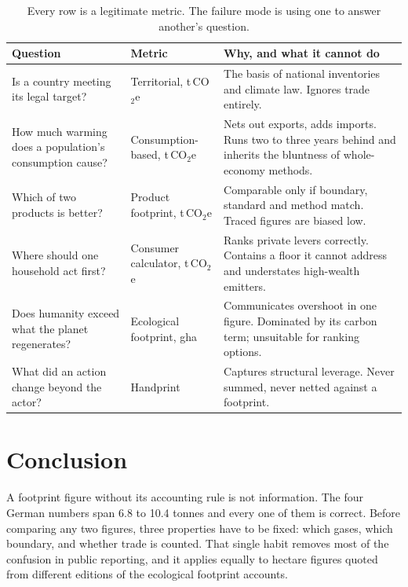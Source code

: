 \documentclass[11pt,a4paper]{article}
\begin{document}
\begin{table}[htbp]
\centering
\small
\caption{Every row is a legitimate metric. The failure mode is using one to answer
another's question.}
\vspace{2pt}
\begin{tabularx}{\linewidth}{@{}p{3.4cm}p{2.3cm}X@{}}
\toprule
\textbf{Question} & \textbf{Metric} & \textbf{Why, and what it cannot do} \\
\midrule
Is a country meeting its legal target? & Territorial, t\,CO$_2$e & The basis of national inventories and climate law. Ignores trade entirely. \\
\addlinespace[2pt]
How much warming does a population's consumption cause? & Consumption-based, t\,CO$_2$e & Nets out exports, adds imports. Runs two to three years behind and inherits the bluntness of whole-economy methods. \\
\addlinespace[2pt]
Which of two products is better? & Product footprint, t\,CO$_2$e & Comparable only if boundary, standard and method match. Traced figures are biased low. \\
\addlinespace[2pt]
Where should one household act first? & Consumer calculator, t\,CO$_2$e & Ranks private levers correctly. Contains a floor it cannot address and understates high-wealth emitters. \\
\addlinespace[2pt]
Does humanity exceed what the planet regenerates? & Ecological footprint, gha & Communicates overshoot in one figure. Dominated by its carbon term; unsuitable for ranking options. \\
\addlinespace[2pt]
What did an action change beyond the actor? & Handprint & Captures structural leverage. Never summed, never netted against a footprint. \\
\bottomrule
\end{tabularx}
\end{table}

\section{Conclusion}

A footprint figure without its accounting rule is not information. The four German
numbers span 6.8 to 10.4 tonnes and every one of them is correct. Before comparing
any two figures, three properties have to be fixed: which gases, which boundary, and
whether trade is counted. That single habit removes most of the confusion in public
reporting, and it applies equally to hectare figures quoted from different editions
of the ecological footprint accounts.
\end{document}
